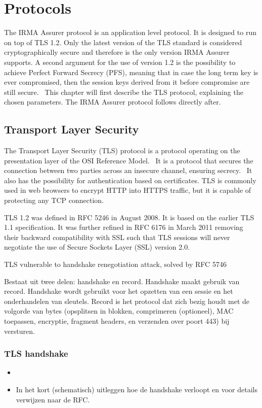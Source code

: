 \section{Protocols}
The IRMA Assurer protocol is an application level protocol. It is designed to run on top of TLS 1.2. Only the latest version of the TLS standard is considered cryptographically secure and therefore is the only version IRMA Assurer supports. A second argument for the use of version 1.2 is the possibility to achieve Perfect Forward Secrecy (PFS), meaning that in case the long term key is ever compromised, then the session keys derived from it before compromise are still secure.~\cite{PFS} This chapter will first describe the TLS protocol, explaining the chosen parameters. The IRMA Assurer protocol follows directly after.

\subsection{Transport Layer Security}
The Transport Layer Security (TLS) protocol is a protocol operating on the presentation layer of the OSI Reference Model.~\cite{osi} It is a protocol that secures the connection between two parties across an insecure channel, ensuring secrecy.~\cite{tls1.2} It also has the possibility for authentication based on certificates. TLS is commonly used in web browsers to encrypt HTTP into HTTPS traffic, but it is capable of protecting any TCP connection.~\cite{lecture}

TLS 1.2 was defined in RFC 5246 in August 2008. It is based on the earlier TLS 1.1 specification. It was further refined in RFC 6176 in March 2011 removing their backward compatibility with SSL such that TLS sessions will never negotiate the use of Secure Sockets Layer (SSL) version 2.0.

TLS vulnerable to handshake renegotiation attack, solved by RFC 5746~\cite{lecture}

Bestaat uit twee delen: handshake en record. Handshake maakt gebruik van record. Handshake wordt gebruikt voor het opzetten van een sessie en het onderhandelen van sleutels. Record is het protocol dat zich bezig houdt met de volgorde van bytes (opsplitsen in blokken, comprimeren (optioneel), MAC toepassen, encryptie, fragment headers, en verzenden over poort 443) bij versturen.~\cite{lecture}

\subsubsection{TLS handshake}
\begin{itemize}
  \item 
  \item In het kort (schematisch) uitleggen hoe de handshake verloopt en voor details verwijzen naar de RFC.
\end{itemize}

